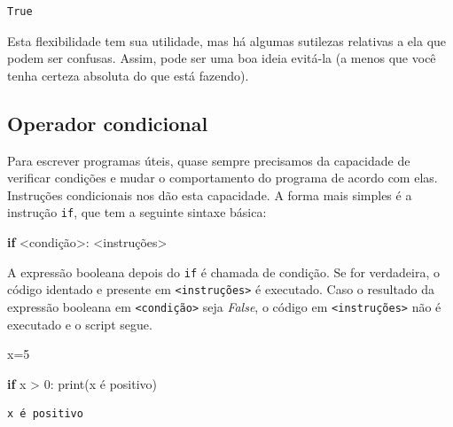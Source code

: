 \documentclass[
  brazilian,
  letterpaper,
  DIV=11,
  numbers=noendperiod]{scrreprt}
\newenvironment{Shaded}{\begin{snugshade}}{\end{snugshade}}
\newcommand{\BuiltInTok}[1]{\textcolor[rgb]{0.00,0.23,0.31}{#1}}
\newcommand{\ControlFlowTok}[1]{\textcolor[rgb]{0.00,0.23,0.31}{\textbf{#1}}}
\newcommand{\DecValTok}[1]{\textcolor[rgb]{0.68,0.00,0.00}{#1}}
\newcommand{\NormalTok}[1]{\textcolor[rgb]{0.00,0.23,0.31}{#1}}
\newcommand{\OperatorTok}[1]{\textcolor[rgb]{0.37,0.37,0.37}{#1}}
\newcommand{\StringTok}[1]{\textcolor[rgb]{0.13,0.47,0.30}{#1}}
\begin{document}
\begin{verbatim}
True
\end{verbatim}

Esta flexibilidade tem sua utilidade, mas há algumas sutilezas relativas
a ela que podem ser confusas. Assim, pode ser uma boa ideia evitá-la (a
menos que você tenha certeza absoluta do que está fazendo).

\subsection{Operador condicional}\label{operador-condicional}

Para escrever programas úteis, quase sempre precisamos da capacidade de
verificar condições e mudar o comportamento do programa de acordo com
elas. Instruções condicionais nos dão esta capacidade. A forma mais
simples é a instrução \texttt{if}, que tem a seguinte sintaxe básica:

\begin{Shaded}
\begin{Highlighting}[]
\ControlFlowTok{if} \OperatorTok{\textless{}}\NormalTok{condição}\OperatorTok{\textgreater{}}\NormalTok{:}
    \OperatorTok{\textless{}}\NormalTok{instruções}\OperatorTok{\textgreater{}}
\end{Highlighting}
\end{Shaded}

A expressão booleana depois do \texttt{if} é chamada de condição. Se for
verdadeira, o código identado e presente em
\texttt{\textless{}instruções\textgreater{}} é executado. Caso o
resultado da expressão booleana em
\texttt{\textless{}condição\textgreater{}} seja \emph{False}, o código
em \texttt{\textless{}instruções\textgreater{}} não é executado e o
script segue.

\begin{Shaded}
\begin{Highlighting}[]
\NormalTok{x}\OperatorTok{=}\DecValTok{5}

\ControlFlowTok{if}\NormalTok{ x }\OperatorTok{\textgreater{}} \DecValTok{0}\NormalTok{:}
    \BuiltInTok{print}\NormalTok{(}\StringTok{\textquotesingle{}x é positivo\textquotesingle{}}\NormalTok{)}
\end{Highlighting}
\end{Shaded}

\begin{verbatim}
x é positivo
\end{verbatim}
\end{document}
